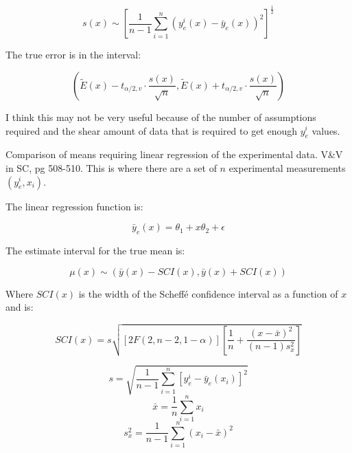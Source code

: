 \documentclass{article}
\begin{document}
\begin{equation}
  s(x) \sim \left [ \frac{1}{n-1} \sum^n_{i=1}\left ( y^i_e(x) - \bar{y}_e(x) \right ) ^2 \right ] ^\frac{1}{2}
\end{equation}

The true error is in the interval:

\begin{equation}
  \left ( \tilde{E}(x)-t_{\alpha/2,v}\cdot\frac{s(x)}{\sqrt{n}},\tilde{E}(x)+t_{\alpha/2,v}\cdot\frac{s(x)}{\sqrt{n}}  \right )
\end{equation}

I think this may not be very useful because of the number of
assumptions required and the shear amount of data that is required to
get enough $y^i_e$ values.

Comparison of means requiring linear regression of the experimental
data. V\&V in SC, pg 508-510. This is where there are a set of $n$
experimental measurements $(y^i_e,x_i)$.

The linear regression function is:

\begin{equation}
  \bar{y}_e(x) = \theta_1 + x\theta_2+\epsilon
\end{equation}

The estimate interval for the true mean is:

\begin{equation}
  \mu(x) \sim (\bar{y}(x) - SCI(x),\bar{y}(x)+SCI(x))
\end{equation}

Where $SCI(x)$ is the width of the Scheff\'e confidence interval as a function of $x$ and is:

\begin{equation}
  SCI(x) = s\sqrt{[2F(2,n-2,1-\alpha)]\left [ \frac{1}{n}+\frac{(x-\bar{x})^2}{(n-1)s^2_x} \right ] }
\end{equation}

\begin{equation}
  s = \sqrt{\frac{1}{n-1}\sum^n_{i=1}\left [ y^i_e-\bar{y}_e(x_i) \right ]^2}
\end{equation}
\begin{equation}
  \bar{x} = \frac{1}{n}\sum^n_{i=1}x_i
\end{equation}
\begin{equation}
  s^2_x=\frac{1}{n-1}\sum^n_{i=1}(x_i-\bar{x})^2
\end{equation}
\end{document}
